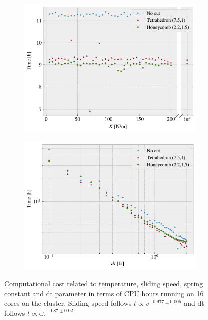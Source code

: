 \begin{figure}[H]
\begin{subfigure}[t]{0.49\textwidth}
      \includegraphics[width=\textwidth]{figures/baseline/comp_cost_K.pdf}
      \caption{}
      \label{fig:comp_K}
    \end{subfigure}
    \hfill
    \begin{subfigure}[t]{0.49\textwidth}
        \centering
        \includegraphics[width=\textwidth]{figures/baseline/comp_cost_dt.pdf}
        \caption{}
        \label{fig:comp_dt}
    \end{subfigure}
    \hfill
    \caption{Computational cost related to temperature, sliding speed, spring
    constant and dt parameter in terms of CPU hours running on 16 cores on the
    cluster. Sliding speed follows $t \propto
    v^{-0.977 \pm 0.005}$ and dt follows $t \propto \text{dt}^{-0.87\pm 0.02}$}
    \label{fig:comp_cost}
\end{figure}

